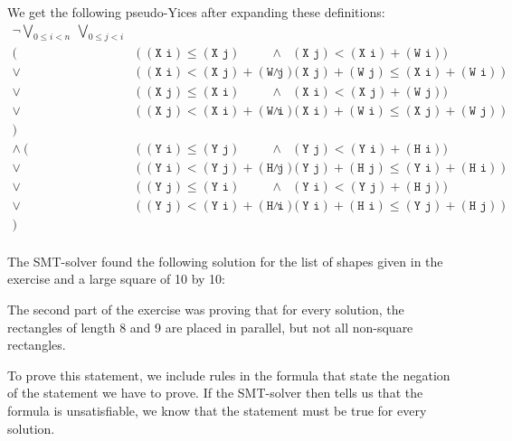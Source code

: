 \documentclass[12pt]{article}
\begin{document}
We get the following pseudo-Yices after expanding these definitions:
\[
    \begin{array}{rlcl}
        \neg \bigvee_{0 \le i < n} ~ \bigvee_{0 \le j < i} & & & \\
            (~~~ & (~(\texttt{X i}) \le (\texttt{X j}) & \wedge & (\texttt{X j}) < (\texttt{X i}) + (\texttt{W i}) ) \\
            \vee & (~(\texttt{X i}) < (\texttt{X j}) + (\texttt{W j}) & \wedge & (\texttt{X j}) + (\texttt{W j}) \le (\texttt{X i}) + (\texttt{W i})~) \\
            \vee & (~(\texttt{X j}) \le (\texttt{X i}) & \wedge & (\texttt{X i}) < (\texttt{X j}) + (\texttt{W j}) ) \\
            \vee & (~(\texttt{X j}) < (\texttt{X i}) + (\texttt{W i}) & \wedge & (\texttt{X i}) + (\texttt{W i}) \le (\texttt{X j}) + (\texttt{W j})~) \\
            )~~~ & & & \\
     \wedge~(~~~ & (~(\texttt{Y i}) \le (\texttt{Y j}) & \wedge & (\texttt{Y j}) < (\texttt{Y i}) + (\texttt{H i}) ) \\
            \vee & (~(\texttt{Y i}) < (\texttt{Y j}) + (\texttt{H j}) & \wedge & (\texttt{Y j}) + (\texttt{H j}) \le (\texttt{Y i}) + (\texttt{H i})~) \\
            \vee & (~(\texttt{Y j}) \le (\texttt{Y i}) & \wedge & (\texttt{Y i}) < (\texttt{Y j}) + (\texttt{H j}) ) \\
            \vee & (~(\texttt{Y j}) < (\texttt{Y i}) + (\texttt{H i}) & \wedge & (\texttt{Y i}) + (\texttt{H i}) \le (\texttt{Y j}) + (\texttt{H j})~) \\
            )~~~ & & & \\
    \end{array}
\]

The SMT-solver found the following solution for the list of shapes given in the exercise and a large square of 10 by 10:\\
\begin{center}
\end{center}

The second part of the exercise was proving that for every solution, 
the rectangles of length 8 and 9 are placed in parallel, 
but not all non-square rectangles. 

To prove this statement, we include rules in the formula 
that state the negation of the statement we have to prove.
If the SMT-solver then tells us that the formula is unsatisfiable, we know that the statement must be true for every solution. 
\end{document}

